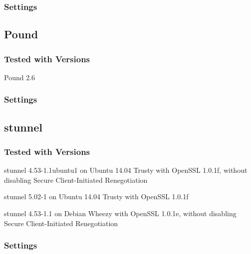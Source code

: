 \subsubsection{Settings}


\subsection{Pound}

\subsubsection{Tested with Versions}
\begin{itemize*}
  \item Pound 2.6
\end{itemize*}

\subsubsection{Settings}


\subsection{stunnel}

\subsubsection{Tested with Versions}
\begin{itemize*}
  \item stunnel 4.53-1.1ubuntu1 on Ubuntu 14.04 Trusty with OpenSSL 1.0.1f, without disabling Secure Client-Initiated Renegotiation
  \item stunnel 5.02-1 on Ubuntu 14.04 Trusty with OpenSSL 1.0.1f
  \item stunnel 4.53-1.1 on Debian Wheezy with OpenSSL 1.0.1e, without disabling Secure Client-Initiated Renegotiation
\end{itemize*}

\subsubsection{Settings}


